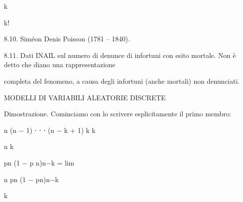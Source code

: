 \documentclass[a4paper,portrait,12pt]{article}
\begin{document}
\begin{flushleft}
k
\end{flushleft}


\begin{flushleft}
k!
\end{flushleft}





\begin{flushleft}
8.10. Sim\'{e}on Denis Poisson (1781 -- 1840).
\end{flushleft}


\begin{flushleft}
8.11. Dati INAIL sul numero di denunce di infortuni con esito mortale. Non \`{e} detto che diano una rappresentazione
\end{flushleft}


\begin{flushleft}
completa del fenomeno, a causa degli infortuni (anche mortali) non denunciati.
\end{flushleft}










\begin{flushleft}
MODELLI DI VARIABILI ALEATORIE DISCRETE
\end{flushleft}





\begin{flushleft}
Dimostrazione. Cominciamo con lo scrivere esplicitamente il primo membro:
\end{flushleft}


\begin{flushleft}
n (n $-$ 1) ⋅ ⋅ ⋅ (n $-$ k + 1) k k
\end{flushleft}


\begin{flushleft}
n k
\end{flushleft}


\begin{flushleft}
pn (1 $-$ p n)n$-$k = lim
\end{flushleft}


\begin{flushleft}
n pn (1 $-$ pn)n$-$k
\end{flushleft}


\begin{flushleft}
k
\end{flushleft}
\end{document}
